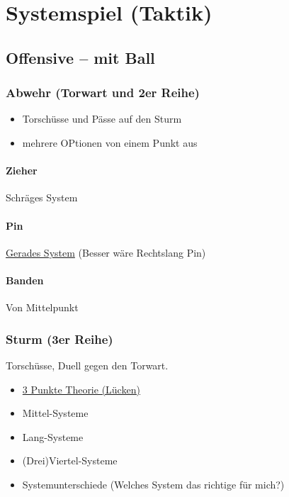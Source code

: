 \chapter{Systemspiel (Taktik)}
\label{taktik}

\section{Offensive -- mit Ball}

\subsection{Abwehr (Torwart und 2er Reihe)}
\label{taktik:offensive:abwehr}

\begin{itemize}
\item Torschüsse und Pässe auf den Sturm 
\item mehrere OPtionen von einem Punkt aus
\end{itemize}

\subsubsection{Zieher}
Schräges System

\subsubsection{Pin}
\href{http://ungeblogtkickern.blogspot.de/2014/12/schusssystem-linkslang-pin-aus-der.html}{Gerades System}
(Besser wäre Rechtslang Pin)

\subsubsection{Banden}
Von Mittelpunkt



\subsection{Sturm (3er Reihe)}
\label{taktik:offensive:sturm}

Torschüsse, Duell gegen den Torwart.

\begin{itemize}
\item \href{http://ungeblogtkickern.blogspot.de/2015/11/3-punkte-theorie-auf-der-3er-reihe.html}{3 Punkte Theorie (Lücken)}
\item Mittel-Systeme
\item Lang-Systeme
\item (Drei)Viertel-Systeme
\item Systemunterschiede (Welches System das richtige für mich?)
\end{itemize}

